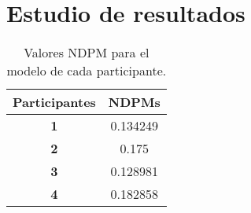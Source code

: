 \section{Estudio de resultados}

\newtoggle{inTableHeader}%
\toggletrue{inTableHeader}%
\newcommand*{\StartTableHeader}{\global\toggletrue{inTableHeader}}%
\newcommand*{\EndTableHeader}{\global\togglefalse{inTableHeader}}%

\begin{table}[H]
    \begin{center}
        \begin{tabular}{|c|c|}
            \hline
            \rowcolor{Cyan} 
            \textbf{Participantes} & \textbf{NDPMs} \\ 
            \hline
            \textbf{1} & 0.134249 \\
            \hline
            \rowcolor{GrisTabla}
            \textbf{2} & 0.175 \\
            \hline
            \textbf{3} & 0.128981 \\
            \hline
            \rowcolor{GrisTabla}
            \textbf{4} & 0.182858 \\
            \hline
        \end{tabular}
        \caption{\centering Valores NDPM para el modelo de cada participante.}\label{tab:NDPM_PARTICIPANTES}
    \end{center}    
\end{table}

